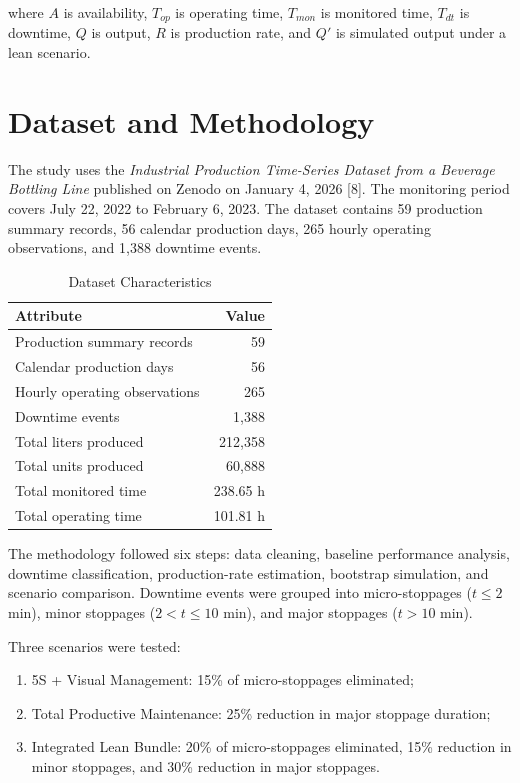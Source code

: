 \documentclass[12pt,a4paper]{article}
\begin{document}
where $A$ is availability, $T_{op}$ is operating time, $T_{mon}$ is monitored time, $T_{dt}$ is downtime, $Q$ is output, $R$ is production rate, and $Q'$ is simulated output under a lean scenario.

\section{Dataset and Methodology}
The study uses the \emph{Industrial Production Time-Series Dataset from a Beverage Bottling Line} published on Zenodo on January 4, 2026 [8]. The monitoring period covers July 22, 2022 to February 6, 2023. The dataset contains 59 production summary records, 56 calendar production days, 265 hourly operating observations, and 1,388 downtime events.

\begin{table}[H]
\centering
\caption{Dataset Characteristics}
\begin{tabular}{lr}
\toprule
Attribute & Value \\
\midrule
Production summary records & 59 \\
Calendar production days & 56 \\
Hourly operating observations & 265 \\
Downtime events & 1,388 \\
Total liters produced & 212,358 \\
Total units produced & 60,888 \\
Total monitored time & 238.65 h \\
Total operating time & 101.81 h \\
\bottomrule
\end{tabular}
\end{table}

The methodology followed six steps: data cleaning, baseline performance analysis, downtime classification, production-rate estimation, bootstrap simulation, and scenario comparison. Downtime events were grouped into micro-stoppages ($t \leq 2$ min), minor stoppages ($2 < t \leq 10$ min), and major stoppages ($t > 10$ min).

Three scenarios were tested:
\begin{enumerate}
    \item 5S + Visual Management: 15\% of micro-stoppages eliminated;
    \item Total Productive Maintenance: 25\% reduction in major stoppage duration;
    \item Integrated Lean Bundle: 20\% of micro-stoppages eliminated, 15\% reduction in minor stoppages, and 30\% reduction in major stoppages.
\end{enumerate}
\end{document}
